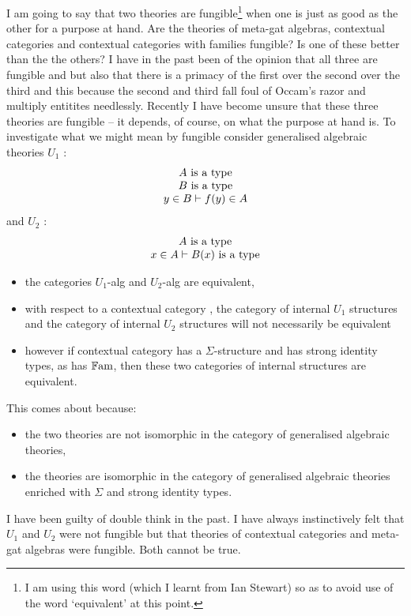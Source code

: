 

\note {} I am going to say that two theories are fungible\footnote{I am using this word (which I learnt from Ian Stewart) so as to avoid use of the word `equivalent' at this point.} when one is just as good as the other for a purpose at hand.
\note 
Are the theories of meta-gat algebras, contextual categories and contextual categories with families fungible? Is one of these better than the the others? I have in the past been of the opinion that all three are fungible and but also that there is a primacy of the  first over the second over the third and this because the second and third fall foul of Occam's razor and multiply entitites needlessly.  Recently I have become unsure that these three theories are fungible -- it depends, of course, on what the purpose at hand is.
\note
To investigate what we might mean by fungible consider generalised algebraic theories $U_1$ :
\begin{equation*}
\label{tmorphism}
\begin{array}{c}
A\mbox{ is a type} \\
B\mbox{ is a type} \\
y \in B \vdash f(y) \in A
\end{array}
\end{equation*}
and $U_2$ :
\begin{equation*}
\label{tfamily}
\begin{array}{c}
A\mbox{ is a type} \\
x \in A \vdash B(x)\mbox{ is a type} \\
\end{array}
\end{equation*}

\begin{itemize}
\item the categories $U_1$-alg and $U_2$-alg  are equivalent,
\item 
 with respect to a contextual category \catcw, the category of internal $U_1$ structures and the category of internal  $U_2$ structures will not necessarily be equivalent 
\item however if contextual category  
\catcw has a $\Sigma$-structure and has strong identity types, as has $\mathbb{F\mathrm{am}} $, then these two categories of internal structures
are equivalent.
\end{itemize}  

This comes about because:
\begin{itemize}
\item  the two theories are not isomorphic in the category of generalised algebraic theories, 
\item  the theories are isomorphic in the category of  generalised algebraic theories enriched with $\Sigma$ 
and strong identity types.
\end{itemize}
\note I have been guilty of double think in the past. I have always instinctively felt that $U_1$ and
$U_2$ were not fungible but that theories of contextual categories and meta-gat algebras were fungible.
Both cannot be true.

